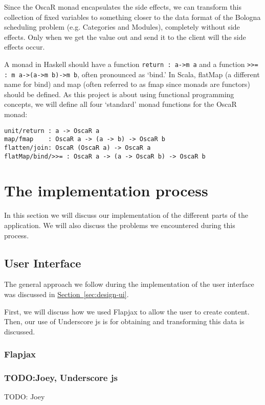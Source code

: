 \documentclass[a4paper]{article}
\begin{document}
Since the OscaR monad encapsulates the side effects,
we can transform this collection of fixed variables to something closer to the
data format of the Bologna scheduling problem (e.g. Categories and Modules),
completely without side effects.
Only when we get the value out and send it to the client will the side effects occur.

A monad in Haskell should have a function \verb|return : a->m a| and a function
 \verb|>>= : m a->(a->m b)->m b|, often pronounced as `bind.'
In Scala, flatMap (a different name for bind) and 
map (often referred to as fmap since monads are functors) should be defined.
As this project is about using functional programming concepts, 
we will define all four `standard' monad functions for the OscaR monad:
\begin{verbatim}
unit/return : a -> OscaR a
map/fmap	: OscaR a -> (a -> b) -> OscaR b
flatten/join: OscaR (OscaR a) -> OscaR a
flatMap/bind/>>= : OscaR a -> (a -> OscaR b) -> OscaR b
\end{verbatim}

\section{The implementation process}
\label{sec:impl}
In this section we will discuss our implementation of the different parts
of the application.
We will also discuss the problems we encountered during this process.

\subsection{User Interface}
The general approach we follow during the implementation of the user interface
was discussed in
\hyperref[sec:design-ui]{Section~\ref*{sec:design-ui}}.

First, we will discuss how we used Flapjax to allow the user to create content.
Then, our use of Underscore js is for obtaining and transforming this data
is discussed.
\subsubsection{Flapjax}


\subsubsection{TODO:Joey, Underscore js}
{\Large TODO:} Joey
\end{document}
